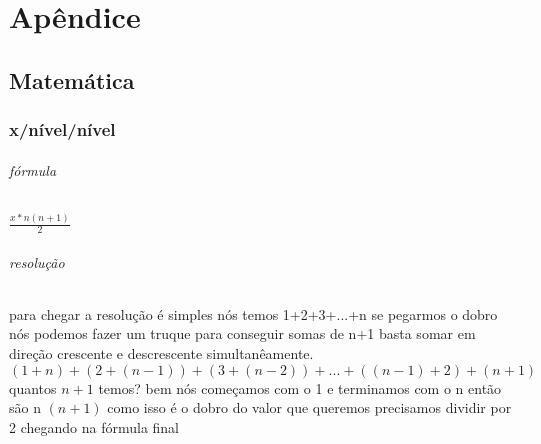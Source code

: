 \part{Apêndice}

\chapter{Matemática}
\section{x/nível/nível}
\paragraph{fórmula} \(\frac{x*n(n+1)}{2}\)
\paragraph{resolução} para chegar a resolução é simples nós temos 1+2+3+...+n
se pegarmos o dobro nós podemos fazer um truque para conseguir somas de n+1 basta somar em direção crescente e descrescente simultanêamente.
\((1+n) + (2 + (n-1)) + (3 + (n-2))+ ... +((n-1)+2) + (n+1)\)
quantos \(n+1\) temos? bem nós começamos com o 1 e terminamos com o n
então são n \((n+1)\) como isso é o dobro do valor que queremos precisamos dividir por 2 chegando na fórmula final 
